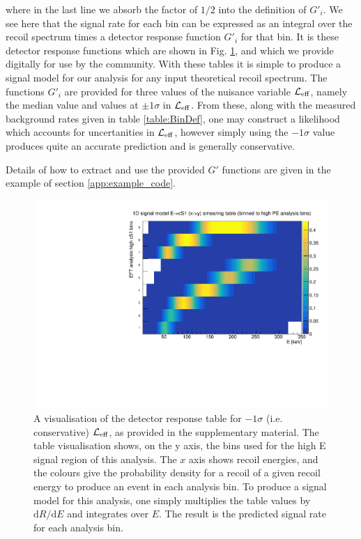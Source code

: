 where in the last line we absorb the factor of $1/2$ into the definition of $G'_i$. We see here that the signal rate for each bin can be expressed as an integral over the recoil spectrum times a detector response function $G'_i$ for that bin. It is these detector response functions which are shown in Fig. \ref{fig:smeartable_highE}, and which we provide digitally for use by the community. With these tables it is simple to produce a signal model for our analysis for any input theoretical recoil spectrum. The functions $G'_i$ are provided for three values of the nuisance variable $\mathcal{L}_{\mathrm{eff}}$, namely the median value and values at $\pm 1 \sigma$ in $\mathcal{L}_{\mathrm{eff}}$. From these, along with the measured background rates given in table \ref{table:BinDef}, one may construct a likelihood which accounts for uncertanities in $\mathcal{L}_{\mathrm{eff}}$, however simply using the $-1\sigma$ value produces quite an accurate prediction and is generally conservative.

Details of how to extract and use the provided $G'$ functions are given in the example of section \ref{app:example_code}. 

\begin{figure}
\centerline{\includegraphics[width=1.\linewidth]{Figures/smeartable_highE}}
\caption{A visualisation of the detector response table for $-1\sigma$ (i.e. conservative) $\mathcal{L}_{\mathrm{eff}}$, as provided in the supplementary material. The table visualisation shows, on the y axis, the bins used for the high E signal region of this analysis. The $x$ axis shows recoil energies, and the colours give the probability density for a recoil of a given recoil energy to produce an event in each analysis bin. To produce a signal model for this analysis, one simply multiplies the table values by $\mathrm{d}R/\mathrm{d}E$ and integrates over $E$. The result is the predicted signal rate for each analysis bin.}
\label{fig:smeartable_highE}
\end{figure}  

